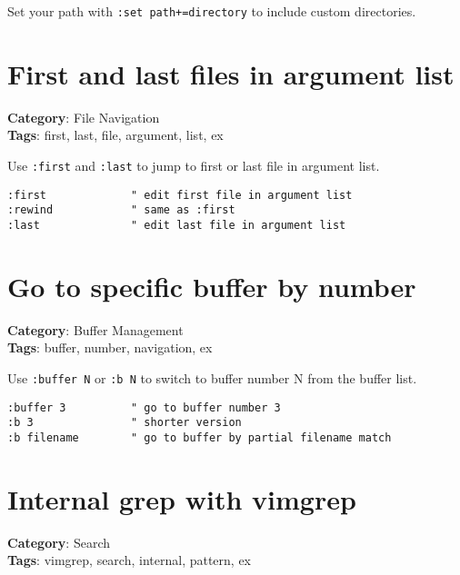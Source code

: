 {{{{{Set your path with {\footnotesize \Verb§:set path+=directory§} to include custom directories.

\section{First and last files in argument list}

\textbf{Category}: File Navigation\\ \textbf{Tags}: first, last, file, argument, list, ex
\vspace{0.5cm}

Use {\footnotesize \Verb§:first§} and {\footnotesize \Verb§:last§} to jump to first or last file in argument list.

\begin{Exa*}{}
\begin{Verbatim}[fontsize=\footnotesize, breaklines, breakanywhere]
:first             " edit first file in argument list
:rewind            " same as :first
:last              " edit last file in argument list
\end{Verbatim}
\end{Exa*}

\section{Go to specific buffer by number}

\textbf{Category}: Buffer Management\\ \textbf{Tags}: buffer, number, navigation, ex
\vspace{0.5cm}

Use {\footnotesize \Verb§:buffer N§} or {\footnotesize \Verb§:b N§} to switch to buffer number N from the buffer list.

\begin{Exa*}{}
\begin{Verbatim}[fontsize=\footnotesize, breaklines, breakanywhere]
:buffer 3          " go to buffer number 3
:b 3               " shorter version
:b filename        " go to buffer by partial filename match
\end{Verbatim}
\end{Exa*}

\section{Internal grep with vimgrep}

\textbf{Category}: Search\\ \textbf{Tags}: vimgrep, search, internal, pattern, ex
\vspace{0.5cm}

}}}}}
